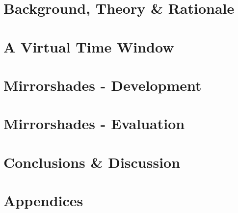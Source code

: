 \documentclass{report}
\begin{document}
\chapter{Background, Theory \& Rationale}
\graphicspath{ {03_background/images/} }

%


\chapter{A Virtual Time Window}
\graphicspath{ {04_vtw/images/} }



\chapter{Mirrorshades - Development}
\graphicspath{ {05_mirrorshades_design_implementation/} }



\chapter{Mirrorshades - Evaluation}
\graphicspath{ {06_mirrorshades_studies_results/} }



\chapter{Conclusions \& Discussion}



\chapter*{Appendices}






\end{document}
